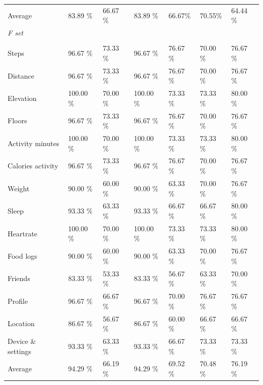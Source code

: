 \begin{appendices}
\begin{table}
\begin{tabular}{P{2.5cm}P{1.7cm}P{1.6cm}P{1.5cm}P{1.5cm}P{1.5cm}P{1.9cm}}
\cmidrule(r){2-7}
Average & 83.89 \% & 66.67 \% & 83.89 \% & 66.67\% & 70.55\% & 64.44 \%\\ 
\cmidrule(r){1-7}
\textit{F set}\\
\\
Steps & 96.67 \% & 73.33 \% &96.67 \%  & 76.67 \%& 70.00 \% & 76.67 \%\\
Distance & 96.67 \% &73.33 \% &96.67 \% & 76.67 \% & 70.00 \%& 76.67 \%\\
Elevation & 100.00 \%&70.00 \% &100.00 \% & 73.33 \% & 73.33 \%& 80.00 \%\\
Floors & 96.67 \%& 73.33 \% &96.67 \% & 76.67 \% & 70.00 \% & 76.67 \%\\
Activity minutes &100.00 \% & 70.00 \% & 100.00 \% & 73.33 \% & 73.33 \% & 80.00 \%\\
Calories activity &96.67 \%&73.33 \% &96.67 \% & 76.67 \% & 70.00 \% & 76.67 \%\\
Weight &90.00 \% &60.00 \% &90.00 \% & 63.33 \% & 70.00 \%& 76.67 \%\\
Sleep &93.33 \% &63.33 \% &93.33 \% & 66.67 \% & 66.67 \% & 80.00 \%\\
Heartrate &100.00 \% &70.00 \% &100.00 \% & 73.33 \% & 73.33 \% & 80.00 \%\\
Food logs &90.00 \% &60.00 \% &90.00 \% & 63.33 \% & 70.00 \%& 76.67 \%\\
Friends &83.33 \% &53.33 \% &83.33 \% & 56.67 \% & 63.33 \% & 70.00 \%\\
Profile &96.67 \% &66.67 \% &96.67 \% & 70.00 \% &76.67 \% & 76.67 \%\\
Location  &86.67 \% &56.67 \% &86.67 \% & 60.00 \% & 66.67 \% & 66.67 \%\\
Device \& settings &93.33 \%  & 63.33 \% &93.33 \% & 66.67 \% & 73.33 \% & 73.33 \%\\

\cmidrule(r){2-7}
Average & 94.29 \%& 66.19 \% & 94.29 \% & 69.52 \% &  70.48 \% & 76.19 \%\\
\cmidrule(r){1-7}


\end{tabular}
\end{table}
\end{appendices}
